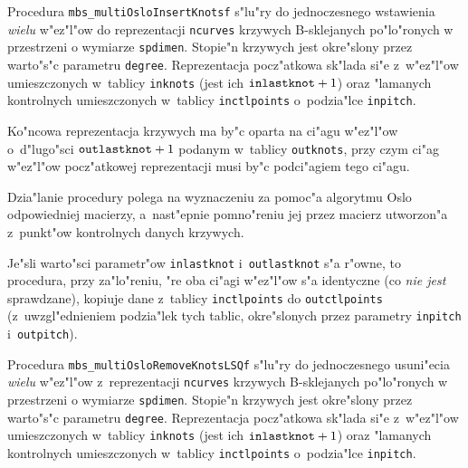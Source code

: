 \vspace{\bigskipamount}
\begin{sloppypar}
Procedura \texttt{mbs\_multiOsloInsertKnotsf} s"lu"ry do jednoczesnego
wstawienia \emph{wielu} w"ez"l"ow do reprezentacji \texttt{ncurves} krzywych
B-sklejanych po"lo"ronych w przestrzeni o wymiarze \texttt{spdimen}.
Stopie"n krzywych jest okre"slony przez warto"s"c parametru \texttt{degree}.
Reprezentacja pocz"atkowa sk"lada si"e z~w"ez"l"ow umieszczonych w~tablicy
\texttt{inknots} (jest ich $\mathord{\mbox{\texttt{inlastknot}}}+1$)
oraz "lamanych kontrolnych umieszczonych w~tablicy \texttt{inctlpoints}
o~podzia"lce \texttt{inpitch}.

Ko"ncowa reprezentacja krzywych ma by"c oparta na ci"agu w"ez"l"ow
o~d"lugo"sci $\mathord{\mbox{\texttt{outlastknot}}}+1$ podanym w~tablicy
\texttt{outknots}, przy czym ci"ag w"ez"l"ow pocz"atkowej reprezentacji musi
by"c podci"agiem tego ci"agu.
\end{sloppypar}

Dzia"lanie procedury polega na wyznaczeniu za pomoc"a algorytmu Oslo
odpowiedniej macierzy, a~nast"epnie pomno"reniu jej przez macierz utworzon"a
z~punkt"ow kontrolnych danych krzywych.

Je"sli warto"sci parametr"ow \texttt{inlastknot} i~\texttt{outlastknot}
s"a r"owne, to procedura, przy za"lo"reniu, "re oba ci"agi w"ez"l"ow s"a
identyczne (co \emph{nie jest} sprawdzane), kopiuje dane z~tablicy
\texttt{inctlpoints} do \texttt{outctlpoints} (z~uwzgl"ednieniem podzia"lek
tych tablic, okre"slonych przez parametry \texttt{inpitch}
i~\texttt{outpitch}).

\vspace{\bigskipamount}
Procedura \texttt{mbs\_multiOsloRemoveKnotsLSQf} s"lu"ry do jednoczesnego
usuni"ecia \emph{wielu} w"ez"l"ow z~reprezentacji \texttt{ncurves} krzywych
B-sklejanych po"lo"ronych w przestrzeni o wymiarze \texttt{spdimen}.
Stopie"n krzywych jest okre"slony przez warto"s"c parametru \texttt{degree}.
Reprezentacja pocz"atkowa sk"lada si"e z~w"ez"l"ow umieszczonych w~tablicy
\texttt{inknots} (jest ich $\mathord{\mbox{\texttt{inlastknot}}}+1$)
oraz "lamanych kontrolnych umieszczonych w~tablicy \texttt{inctlpoints}
o~podzia"lce \texttt{inpitch}.

